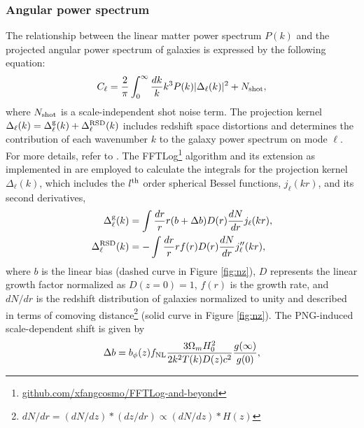 \subsubsection{Angular power spectrum}
The relationship between the linear matter power spectrum $P(k)$ and the projected angular power spectrum of galaxies is expressed by the following equation:
\begin{equation}\label{eq:cell}
C_{\ell} = \frac{2}{\pi}\int_{0}^{\infty}\frac{dk}{k}k^{3}P(k)|\Delta_{\ell}(k)|^{2} + N_{\rm shot},
\end{equation}
where $N_{\rm shot}$ is a scale-independent shot noise term. The projection kernel $\Delta_{\ell}(k) = \Delta^{\rm g}_{\ell}(k) + \Delta^{\rm RSD}_{\ell}(k)$ includes redshift space distortions and determines the contribution of each wavenumber $k$ to the galaxy power spectrum on mode $\ell$. For more details, refer to \cite{Padmanabhan2007}. The FFTLog\footnote{\href{https://github.com/xfangcosmo/FFTLog-and-beyond}{github.com/xfangcosmo/FFTLog-and-beyond}} algorithm and its extension as implemented in \cite{fang2020beyond} are employed to calculate the integrals for the projection kernel $\Delta_{\ell}(k)$, which includes the $l^{\rm th}$ order spherical Bessel functions, $ j_{\ell}(kr)$, and its second derivatives,
\begin{align}
    \Delta^{\rm g}_{\ell}(k) &= \int \frac{dr}{r} r (b+\Delta b) D(r) \frac{dN}{dr} j_{\ell}(kr),\\
    \Delta^{\rm RSD}_{\ell}(k) &= - \int \frac{dr}{r} r f(r) D(r) \frac{dN}{dr} j^{\prime\prime}_{\ell}(kr),
\end{align}
where $b$ is the linear bias (dashed curve in Figure \ref{fig:nz}), $D$ represents the linear growth factor normalized as $D(z=0)=1$, $f(r)$ is the growth rate, and $dN/dr$ is the redshift distribution of galaxies normalized to unity and described in terms of comoving distance\footnote{$dN/dr = (dN/dz)*(dz/dr) \propto (dN/dz)*H(z)$} (solid curve in Figure \ref{fig:nz}). The PNG-induced scale-dependent shift is given by \citep[see, also,][]{slosar2008constraints}
\begin{equation}
\Delta b = b_{\phi}(z) f_{\rm NL} \frac{3 \Omega_{m} H^{2}_{0}}{2 k^{2}T(k)D(z) c^{2}} \frac{g(\infty)}{g(0)},
\label{eq:scaledepbias}
\end{equation}
